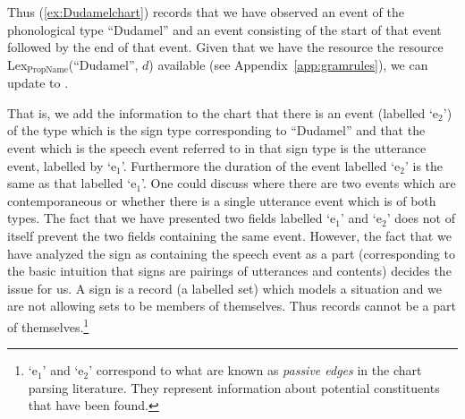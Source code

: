 Thus (\ref{ex:Dudamelchart})
records that we have observed an event of the phonological type
``Dudamel'' and an event consisting of the start of that event
followed by the end of that event.  Given that we have the resource
the resource Lex$_{\mathrm{PropName}}$(``Dudamel'', $d$) available
(see Appendix~\ref{app:gramrules}), we can update \preveg{} to
\nexteg{}.
\begin{ex} 
\end{ex} 
That is, we add the information to the chart that there is an event
(labelled `e$_2$') of
the type which is the sign type corresponding to ``Dudamel'' and that
the event which is the speech event referred to in that sign type is
the utterance event, labelled by `e$_1$'.  Furthermore the duration of
the event labelled `e$_2$' is the same as that labelled `e$_1$'.  One
could discuss where there are two events which are contemporaneous or whether there is a single utterance event
which is of both types.  The fact that we have presented two fields
labelled `e$_1$' and `e$_2$' does not of itself prevent the two fields
containing the same event.  However, the fact that we have analyzed
the sign as containing the speech event as a part (corresponding to
the basic intuition that signs are pairings of utterances and
contents) decides the issue for us.  A sign is a record (a labelled
set) which models a situation and we are not allowing sets to be members of themselves.  Thus
records cannot be a part of themselves.\footnote{`e$_1$' and `e$_2$'
  correspond to what are known as \textit{passive edges} in the chart
  parsing literature.  They represent information about potential
  constituents that have been found.}   

